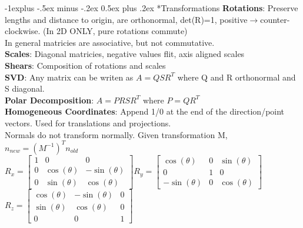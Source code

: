 \documentclass[3pt,landscape]{article}
\makeatletter
\renewcommand{\subsection}{\@startsection{subsection}{2}{0mm}%
                            {-1explus -.5ex minus -.2ex}%
                            {0.5ex plus .2ex}%
                            {\normalfont\normalsize\bfseries}}
\makeatother
\begin{document}
\begin{multicols}{3}
\subsection*{Transformations}
{\bf Rotations}: Preserve lengths and distance to origin, are orthonormal, det(R)=1, positive\(\rightarrow\)counter-clockwise. (In 2D ONLY, pure rotations commute)\\
In general matricies are associative, but not commutative.\\
{\bf Scales}: Diagonal matricies, negative values flit, axis aligned scales\\
{\bf Shears}: Composition of rotations and scales\\
{\bf SVD}: Any matrix can be writen as \(A=QSR^T\) where Q and R orthonormal and S diagonal.\\
{\bf Polar Decomposition}: \(A=PRSR^T\) where \(P=QR^T\)\\
{\bf Homogeneous Coordinates}: Append 1/0 at the end of the direction/point vectors. Used for translations and projections.\\
Normals do not transform normally. Given transformation M, \(n_{new}=(M^{-1})^Tn_{old}\)\\
\(R_x = 
\begin{bmatrix}
1 & 0 & 0 \\
0 & \cos(\theta) & -\sin(\theta)\\
0 & \sin(\theta) & \cos(\theta)
\end{bmatrix}
R_y = 
\begin{bmatrix}
\cos(\theta) & 0 & \sin(\theta) \\
0 & 1 & 0\\
-\sin(\theta) & 0 & \cos(\theta)
\end{bmatrix}\)
\(R_z = 
\begin{bmatrix}
\cos(\theta) & -\sin(\theta) & 0 \\
\sin(\theta) & \cos(\theta) & 0\\
0 & 0 & 1
\end{bmatrix}
\)\\

\end{multicols}
\end{document}
